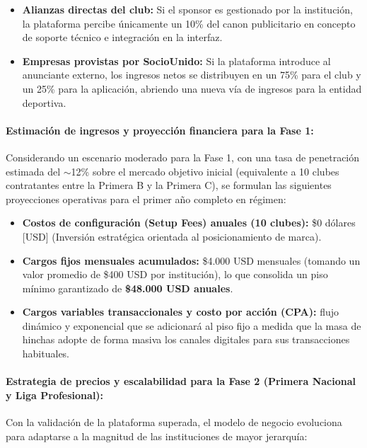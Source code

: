 \begin{enumerate}
    \begin{itemize}
        \item \textbf{Alianzas directas del club:} Si el sponsor es gestionado por la institución, la plataforma percibe únicamente un 10\% del canon publicitario en concepto de soporte técnico e integración en la interfaz.
        \item \textbf{Empresas provistas por SocioUnido:} Si la plataforma introduce al anunciante externo, los ingresos netos se distribuyen en un 75\% para el club y un 25\% para la aplicación, abriendo una nueva vía de ingresos para la entidad deportiva.
    \end{itemize}
\end{enumerate}

\paragraph{Estimación de ingresos y proyección financiera para la Fase 1:}

Considerando un escenario moderado para la Fase 1, con una tasa de penetración estimada del $\sim$12\% sobre el mercado objetivo inicial (equivalente a 10 clubes contratantes entre la Primera B y la Primera C), se formulan las siguientes proyecciones operativas para el primer año completo en régimen:
\begin{itemize}
    \item \textbf{Costos de configuración (Setup Fees) anuales (10 clubes):} \$0 dólares [USD] (Inversión estratégica orientada al posicionamiento de marca).
    \item \textbf{Cargos fijos mensuales acumulados:} \$4.000 USD mensuales (tomando un valor promedio de \$400 USD por institución), lo que consolida un piso mínimo garantizado de \textbf{\$48.000 USD anuales}.
    \item \textbf{Cargos variables transaccionales y costo por acción (CPA):} flujo dinámico y exponencial que se adicionará al piso fijo a medida que la masa de hinchas adopte de forma masiva los canales digitales para sus transacciones habituales.
\end{itemize}

\paragraph{Estrategia de precios y escalabilidad para la Fase 2 (Primera Nacional y Liga Profesional):}

Con la validación de la plataforma superada, el modelo de negocio evoluciona para adaptarse a la magnitud de las instituciones de mayor jerarquía:

